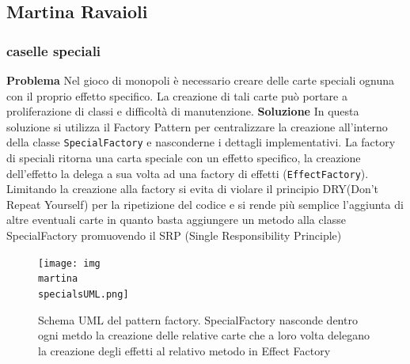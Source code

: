 \subsection{Martina Ravaioli}
\subsubsection{caselle speciali}

\textbf{Problema}\newline
Nel gioco di monopoli è necessario creare delle carte speciali ognuna con il proprio effetto specifico. La creazione di tali carte può portare a proliferazione di classi e difficoltà di manutenzione.\newline\newline
\textbf{Soluzione}\newline
In questa soluzione si utilizza il Factory Pattern per centralizzare la creazione all’interno della classe \texttt{SpecialFactory} e nasconderne i dettagli implementativi.
La factory di speciali ritorna una carta speciale con un effetto specifico, la creazione dell’effetto la delega a sua volta ad una factory di effetti (\texttt{EffectFactory}).
Limitando la creazione alla factory si evita di violare il principio DRY(Don’t Repeat Yourself) per la ripetizione del codice e si rende più semplice l’aggiunta di altre eventuali carte  in quanto basta aggiungere un metodo alla classe SpecialFactory promuovendo il SRP (Single Responsibility Principle)

\begin{figure}[h]
    \centering
    \texttt{[image: img\\martina\\specialsUML.png]}
    \caption{Schema UML del pattern factory. SpecialFactory nasconde dentro ogni metdo la creazione delle relative carte che a loro volta delegano la creazione degli effetti al relativo metodo in Effect Factory}
    \label{img:specialsUML}
\end{figure}

\newline

